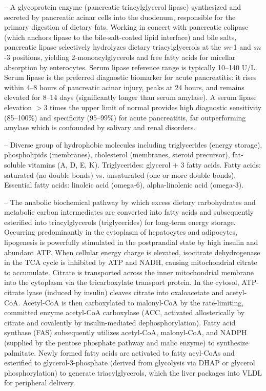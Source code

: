 -- A glycoprotein enzyme (pancreatic triacylglycerol lipase) synthesized and secreted by pancreatic acinar cells into the duodenum, responsible for the primary digestion of dietary fats. Working in concert with pancreatic colipase (which anchors lipase to the bile-salt-coated lipid interface) and bile salts, pancreatic lipase selectively hydrolyzes dietary triacylglycerols at the $sn$-1 and $sn$-3 positions, yielding 2-monoacylglycerols and free fatty acids for micellar absorption by enterocytes. Serum lipase reference range is typically 10--140 U/L. Serum lipase is the preferred diagnostic biomarker for acute pancreatitis: it rises within 4--8 hours of pancreatic acinar injury, peaks at 24 hours, and remains elevated for 8--14 days (significantly longer than serum amylase). A serum lipase elevation $>3$ times the upper limit of normal provides high diagnostic sensitivity (85--100\%) and specificity (95--99\%) for acute pancreatitis, far outperforming amylase which is confounded by salivary and renal disorders.

-- Diverse group of hydrophobic molecules including triglycerides (energy storage), phospholipids (membranes), cholesterol (membranes, steroid precursor), fat-soluble vitamins (A, D, E, K). Triglycerides: glycerol + 3 fatty acids. Fatty acids: saturated (no double bonds) vs. unsaturated (one or more double bonds). Essential fatty acids: linoleic acid (omega-6), alpha-linolenic acid (omega-3).

-- The anabolic biochemical pathway by which excess dietary carbohydrates and metabolic carbon intermediates are converted into fatty acids and subsequently esterified into triacylglycerols (triglycerides) for long-term energy storage. Occurring predominantly in the cytoplasm of hepatocytes and adipocytes, lipogenesis is powerfully stimulated in the postprandial state by high insulin and abundant ATP. When cellular energy charge is elevated, isocitrate dehydrogenase in the TCA cycle is inhibited by ATP and NADH, causing mitochondrial citrate to accumulate. Citrate is transported across the inner mitochondrial membrane into the cytoplasm via the tricarboxylate transport protein. In the cytosol, ATP-citrate lyase (induced by insulin) cleaves citrate into oxaloacetate and acetyl-CoA. Acetyl-CoA is then carboxylated to malonyl-CoA by the rate-limiting, committed enzyme acetyl-CoA carboxylase (ACC, activated allosterically by citrate and covalently by insulin-mediated dephosphorylation). Fatty acid synthase (FAS) subsequently utilizes acetyl-CoA, malonyl-CoA, and NADPH (supplied by the pentose phosphate pathway and malic enzyme) to synthesize palmitate. Newly formed fatty acids are activated to fatty acyl-CoAs and esterified to glycerol-3-phosphate (derived from glycolysis via DHAP or glycerol phosphorylation) to generate triacylglycerols, which the liver packages into VLDL for peripheral delivery.

